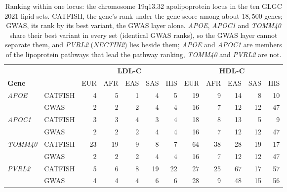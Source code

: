\begin{table}[!htbp]
\centering
\caption{Ranking within one locus: the chromosome 19q13.32 apolipoprotein locus in the ten GLGC 2021 lipid sets. CATFISH, the gene's rank under the gene score among about $18{,}500$ genes; GWAS, its rank by its best variant, the GWAS layer alone. \textit{APOE}, \textit{APOC1} and \textit{TOMM40} share their best variant in every set (identical GWAS ranks), so the GWAS layer cannot separate them, and \textit{PVRL2} (\textit{NECTIN2}) lies beside them; \textit{APOE} and \textit{APOC1} are members of the lipoprotein pathways that lead the pathway ranking, \textit{TOMM40} and \textit{PVRL2} are not.}
\label{tab:apoe_locus}
\small
\begin{tabular*}{\linewidth}{@{\extracolsep{\fill}}ll|rrrrr|rrrrr}
\hline
 & & \multicolumn{5}{c|}{\textbf{LDL-C}} & \multicolumn{5}{c}{\textbf{HDL-C}} \\
\textbf{Gene} & & EUR & AFR & EAS & SAS & HIS & EUR & AFR & EAS & SAS & HIS \\
\hline
\textit{APOE} & CATFISH & 4 & 5 & 1 & 4 & 5 & 19 & 9 & 14 & 8 & 10 \\
 & GWAS & 2 & 2 & 2 & 4 & 4 & 16 & 7 & 12 & 12 & 47 \\
\textit{APOC1} & CATFISH & 3 & 3 & 4 & 3 & 4 & 18 & 8 & 13 & 5 & 9 \\
 & GWAS & 2 & 2 & 2 & 4 & 4 & 16 & 7 & 12 & 12 & 47 \\
\textit{TOMM40} & CATFISH & 23 & 19 & 9 & 8 & 7 & 64 & 38 & 28 & 19 & 17 \\
 & GWAS & 2 & 2 & 2 & 4 & 4 & 16 & 7 & 12 & 12 & 47 \\
\textit{PVRL2} & CATFISH & 5 & 6 & 8 & 19 & 22 & 27 & 25 & 67 & 17 & 57 \\
 & GWAS & 4 & 4 & 4 & 6 & 6 & 28 & 9 & 48 & 15 & 56 \\
\hline
\end{tabular*}
\end{table}
